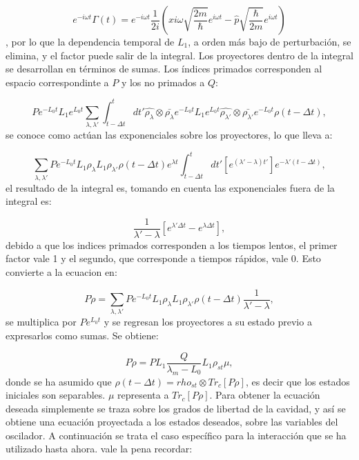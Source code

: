 \documentclass[a4paper,10pt]{report}
\begin{document}
\begin{equation}
e^{-i\omega t}\Gamma(t) = e^{-i\omega t}\frac{1}{2i}(\hat{x}i\omega \sqrt{\frac{2m}{\hbar}}e^{i\omega t}-\hat{p}\sqrt{\frac{\hbar}{2m}}e^{i\omega t})
\end{equation}, por lo que la dependencia temporal de $L_1$, a orden más bajo de perturbación, se elimina, y el factor puede salir de la integral. Los proyectores dentro de la integral se desarrollan en términos de sumas. Los índices primados corresponden al espacio correspondinte a $P$ y los no primados a $Q$:

\begin{equation}
P e^{-L_0 t}L_1e^{L_0 t}\sum_{\lambda ,\lambda'}\int_{t-\Delta t}^{t}dt'\hat{\rho_\lambda}\otimes\bar{\rho_\lambda}e^{-L_0 t}L_1e^{L_0 t}\hat{\rho_{\lambda'}}\otimes\bar{\rho_{\lambda'}}e^{-L_0 t}\rho(t-\Delta t),
\end{equation} se conoce como actúan las exponenciales sobre los proyectores, lo que lleva a:

\begin{equation}
\sum_{\lambda ,\lambda'} P e^{-L_0 t} L_1 \rho_{\lambda} L_1 \rho_{\lambda'} \rho(t-\Delta t) e^{\lambda t} \int_{t-\Delta t}^{t} dt'[ e^{(\lambda'-\lambda)t'}] e^{-\lambda'(t-\Delta t)},
\end{equation} el resultado de la integral es, tomando en cuenta las exponenciales fuera de la integral es:

\begin{equation}
\frac{1}{\lambda' - \lambda} [e^{\lambda' \Delta t}-e^{\lambda \Delta t}],
\end{equation} debido a que los indices primados corresponden a los tiempos lentos, el primer factor vale 1 y el segundo, que corresponde a tiempos rápidos, vale 0. Esto convierte a la ecuacion en:

\begin{equation}
P\dot{\rho}=\sum_{\lambda ,\lambda'} P e^{-L_0 t} L_1 \rho_{\lambda} L_1 \rho_{\lambda'} \rho(t-\Delta t)\frac{1}{\lambda' - \lambda} ,
\end{equation} se multiplica por $Pe^{L_0 t}$ y se regresan los proyectores a su estado previo a expresarlos como sumas. Se obtiene:

\begin{equation}
P\dot{\rho} = PL_1 \frac{Q}{\lambda_m-L_0}L_1\rho_{st}\mu,
\end{equation} donde se ha asumido que $\rho(t-\Delta t)=rho_{st} \otimes Tr_c[P\rho]$, es decir que los estados iniciales son separables. $\mu$ representa a $Tr_c[P\rho]$. Para obtener la ecuación deseada simplemente se traza sobre los grados de libertad de la cavidad, y así se obtiene una ecuación proyectada a los estados deseados, sobre las variables del oscilador. A continuación se trata el caso específico para la interacción que se ha utilizado hasta ahora. vale la pena recordar:
\end{document}
